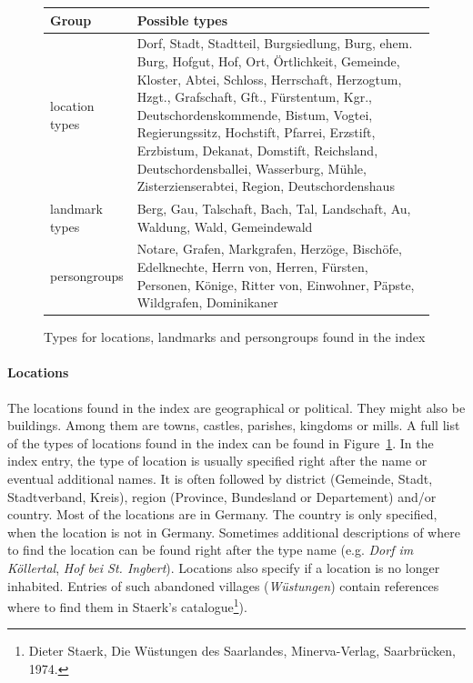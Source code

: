 \begin{figure}[h]
\centering
\begin{tabular}{|l|p{10cm}|}
  \hline
  \textbf{Group}        & \textbf{Possible types}  \\
  \hline
  location types & Dorf, Stadt, Stadtteil, Burgsiedlung, Burg,  ehem. Burg, Hofgut, Hof, Ort, Örtlichkeit, Gemeinde, Kloster,   Abtei, Schloss, Herrschaft, Herzogtum, Hzgt., Grafschaft,    Gft., Fürstentum, Kgr., Deutschordenskommende, Bistum,     Vogtei, Regierungssitz, Hochstift, Pfarrei, Erzstift, Erzbistum, Dekanat, Domstift, Reichsland, Deutschordensballei, Wasserburg, Mühle, Zisterzienserabtei, Region, Deutschordenshaus \\
  \hline
  landmark types & Berg, Gau, Talschaft, Bach, Tal, Landschaft, Au, Waldung, Wald, Gemeindewald \\
  \hline
  persongroups   & Notare, Grafen, Markgrafen, Herzöge, Bischöfe, Edelknechte, Herrn von, Herren, Fürsten, Personen, Könige, Ritter von, Einwohner, Päpste, Wildgrafen, Dominikaner \\
  \hline
\end{tabular}
\caption{Types for locations, landmarks and persongroups found in the
  index}
\label{fig:location-list}
\end{figure}

\paragraph{Locations}
The locations found in the index are geographical or political. They
might also be buildings. Among them are towns, castles, parishes,
kingdoms or mills. A full list of the types of locations found in the
index can be found in Figure~\ref{fig:location-list}. In the index
entry, the type of location is usually specified right after the name
or eventual additional names. It is often followed by district
(Gemeinde, Stadt, Stadtverband, Kreis), region (Province, Bundesland
or Departement) and/or country. Most of the locations are in Germany.
The country is only specified, when the location is not in Germany.
Sometimes additional descriptions of where to find the location can be
found right after the type name (e.g. \textit{Dorf im Köllertal},
\textit{Hof bei St. Ingbert}). Locations also specify if a location is
no longer inhabited. Entries of such abandoned villages
(\textit{Wüstungen}) contain references where to find them in Staerk's
catalogue\footnote{Dieter Staerk, Die Wüstungen des Saarlandes,
  Minerva-Verlag, Saarbrücken,
  1974.}). %

